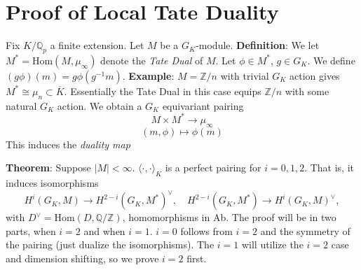 \documentclass[class=article, crop=false]{standalone}
\begin{document}
\section{Proof of Local Tate Duality}

Fix $K/\mathbb{Q}_p$ a finite extension. Let $M$ be a $G_K$-module. 
\vskip 5pt
\textbf{Definition}: We let $M^* = \text{Hom}(M, \mu_{\infty})$ denote the \textit{Tate Dual} of $M$. 
\vskip 5pt 
Let $\phi \in M^*$, $g\in G_K$. We define $(g\phi)(m)=g\phi(g^{-1}m)$. 
\vskip 5pt 
\textbf{Example}: $M=\mathbb{Z}/n$ with trivial $G_K$ action gives $M^*\cong \mu_{n}\subset \overline{K}$. Essentially the Tate Dual in this case equips $\mathbb{Z}/n$ with some natural $G_K$ action.
\vskip 5pt
We obtain a $G_K$ equivariant pairing
\[M\times M^* \to \mu_{\infty}\]
\[(m, \phi) \mapsto \phi(m)\]
This induces the \textit{duality map}


\textbf{Theorem}: Suppose $|M|<\infty$. $\langle \cdot, \cdot \rangle_K$ is a perfect pairing for $i=0,1,2$. 
\vskip 3pt That is, it induces isomorphisms \[H^i(G_K,M) \to H^{2-i}(G_K, M^{*})^{\vee}, \quad  H^{2-i}(G_K,M^{*}) \to H^i(G_K, M)^{\vee},\]
with $D^{\vee} = \text{Hom}(D, \mathbb{Q}/\mathbb{Z})$, homomorphisms in Ab.
\vskip 5pt
The proof will be in two parts, when $i=2$ and when $i=1$. $i=0$ follows from $i=2$ and the symmetry of the pairing (just dualize the isomorphisms). The $i=1$ will utilize the $i=2$ case and dimension shifting, so we prove $i=2$ first.
\end{document}
